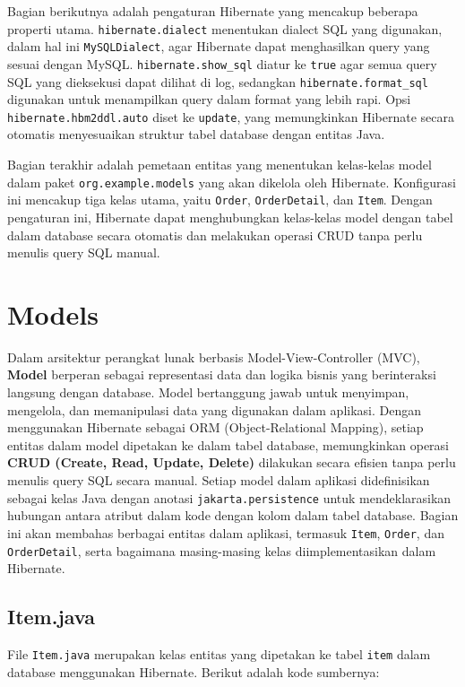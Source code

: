 Bagian berikutnya adalah pengaturan Hibernate yang mencakup beberapa properti utama. \texttt{hibernate.dialect} menentukan dialect SQL yang digunakan, dalam hal ini \texttt{MySQLDialect}, agar Hibernate dapat menghasilkan query yang sesuai dengan MySQL. \texttt{hibernate.show\_sql} diatur ke \texttt{true} agar semua query SQL yang dieksekusi dapat dilihat di log, sedangkan \texttt{hibernate.format\_sql} digunakan untuk menampilkan query dalam format yang lebih rapi. Opsi \texttt{hibernate.hbm2ddl.auto} diset ke \texttt{update}, yang memungkinkan Hibernate secara otomatis menyesuaikan struktur tabel database dengan entitas Java.

Bagian terakhir adalah pemetaan entitas yang menentukan kelas-kelas model dalam paket \texttt{org.example.models} yang akan dikelola oleh Hibernate. Konfigurasi ini mencakup tiga kelas utama, yaitu \texttt{Order}, \texttt{OrderDetail}, dan \texttt{Item}. Dengan pengaturan ini, Hibernate dapat menghubungkan kelas-kelas model dengan tabel dalam database secara otomatis dan melakukan operasi CRUD tanpa perlu menulis query SQL manual.

\section{Models}
Dalam arsitektur perangkat lunak berbasis Model-View-Controller (MVC), \textbf{Model} berperan sebagai representasi data dan logika bisnis yang berinteraksi langsung dengan database. Model bertanggung jawab untuk menyimpan, mengelola, dan memanipulasi data yang digunakan dalam aplikasi. Dengan menggunakan Hibernate sebagai ORM (Object-Relational Mapping), setiap entitas dalam model dipetakan ke dalam tabel database, memungkinkan operasi \textbf{CRUD (Create, Read, Update, Delete)} dilakukan secara efisien tanpa perlu menulis query SQL secara manual. Setiap model dalam aplikasi didefinisikan sebagai kelas Java dengan anotasi \texttt{jakarta.persistence} untuk mendeklarasikan hubungan antara atribut dalam kode dengan kolom dalam tabel database. Bagian ini akan membahas berbagai entitas dalam aplikasi, termasuk \texttt{Item}, \texttt{Order}, dan \texttt{OrderDetail}, serta bagaimana masing-masing kelas diimplementasikan dalam Hibernate.

\subsection{Item.java}

File \texttt{Item.java} merupakan kelas entitas yang dipetakan ke tabel \texttt{item} dalam database menggunakan Hibernate. Berikut adalah kode sumbernya:


